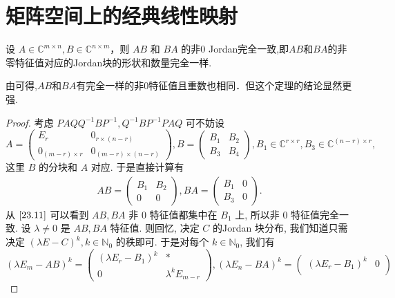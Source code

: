 \documentclass[../../main.tex]{subfiles}%
\begin{document}
\section{矩阵空间上的经典线性映射}

\begin{theorem}\label{theorem:AB和BA的非0Jordan完全一致}
设 \( A \in \mathbb{C}^{m \times n}, B \in \mathbb{C}^{n \times m} \)，则 \( AB \) 和 \( BA \) 的非0 Jordan完全一致,即$AB$和$BA$的非零特征值对应的Jordan块的形状和数量完全一样.
\end{theorem}
\begin{remark}
由可得,$AB$和$BA$有完全一样的非$0$特征值且重数也相同．但这个定理的结论显然更强.
\end{remark}
\begin{proof}
考虑 \( PAQQ^{-1}BP^{-1}, Q^{-1}BP^{-1}PAQ \) 可不妨设
\[
A = \begin{pmatrix}
E_r & 0_{r \times (n - r)} \\
0_{(m - r) \times r} & 0_{(m - r) \times (n - r)}
\end{pmatrix}, B = \begin{pmatrix}
B_1 & B_2 \\
B_3 & B_4
\end{pmatrix}, B_1 \in \mathbb{C}^{r \times r}, B_3 \in \mathbb{C}^{(n - r) \times r},
\]
这里 \( B \) 的分块和 \( A \) 对应. 于是直接计算有
\begin{align}
AB = \begin{pmatrix}
B_1 & B_2 \\
0 & 0
\end{pmatrix}, BA = \begin{pmatrix}
B_1 & 0 \\
B_3 & 0
\end{pmatrix}. \label{23.11}
\end{align}
从 \(\eqref{23.11}\) 可以看到 \( AB, BA \) 非 0 特征值都集中在 \( B_1 \) 上, 所以非 0 特征值完全一致. 设 \( \lambda \neq 0 \) 是 \( AB, BA \) 特征值. 则回忆, 决定 \( C \) 的Jordan 块分布, 我们知道只需决定 \( (\lambda E - C)^k, k \in \mathbb{N}_0 \) 的秩即可. 于是对每个 \( k \in \mathbb{N}_0 \), 我们有
\[
(\lambda E_m - AB)^k = \begin{pmatrix}
(\lambda E_r - B_1)^k & * \\
0 & \lambda^k E_{m - r}
\end{pmatrix}, (\lambda E_n - BA)^k = \begin{pmatrix}
(\lambda E_r - B_1)^k & 0 \\

\end{pmatrix}\]
\end{proof}
\end{document}
